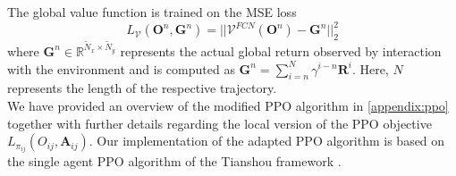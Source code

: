 \documentclass{article}
\theoremstyle{plain}
\theoremstyle{definition}
\theoremstyle{remark}
\begin{document}
The global value function is trained on the MSE loss
\[ L_{\mathcal{V}}(\boldsymbol O^n, \boldsymbol{G}^n) =  ||\mathcal V^{FCN}(\boldsymbol O^n)- \boldsymbol{G}^n||_2^2 \]
where $\boldsymbol{G}^n\in \mathbb R^{\tilde N_x\times \tilde N_y}$ represents the actual global return observed by interaction with the environment and is computed as $\boldsymbol{G}^n=\sum_{i=n}^N \gamma^{i-n} \boldsymbol{R}^i$. Here, $N$ represents the length of the respective trajectory.\\
We have provided an overview of the modified PPO algorithm in \cref{appendix:ppo} together with further details regarding the local version of the PPO objective $L_{\pi_{ij}}( O_{ij},  \boldsymbol{A}_{ij})$. Our implementation of the adapted PPO algorithm is based on the single agent PPO algorithm of the Tianshou framework \cite{tianshou}.
\end{document}
